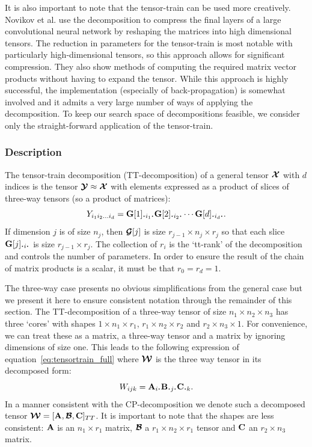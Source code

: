 {It is also important to note that the tensor-train can be used more creatively. 
Novikov et al. \autocite{Novikov} use the decomposition to compress the final layers of a 
large convolutional neural
network by reshaping the matrices into high dimensional tensors. The reduction in parameters for
the tensor-train is most notable with particularly high-dimensional tensors, so this approach allows
for significant compression. They also show methods of computing the required matrix vector products
without having to expand the tensor. While this approach is highly successful, the implementation
(especially of back-propagation) is somewhat involved and it admits a very large number of ways of
applying the decomposition. To keep our search space of decompositions feasible, we consider only
the straight-forward application of the tensor-train.

\subsubsection{Description}
The tensor-train decomposition (TT-decomposition) of a general tensor \(\bm{\mathcal{X}}\) with
\(d\) indices is the tensor \(\bm{\mathcal{Y}} \approx\bm{\mathcal{X}}\) with elements expressed as a
product of slices of three-way tensors (so a product of matrices):
\begin{equation}
			\label{eq:tensortrain_full}
	{Y}_{i_1i_2\dots i_d} 
		= \mat{G}[1]_{\midbullet i_1 \midbullet}\mat{G}[2]_{\midbullet i_2 \midbullet}
			\cdots \mat{G}[d]_{\midbullet i_d \midbullet}.
\end{equation}
If dimension \(j\) is of size \(n_j\), then \(\bm{\mathcal{G}}[j]\) is size 
\(r_{j-1} \times n_j \times r_{j}\) so that each slice \(\mat{G}[j]_{\midbullet i \midbullet}\)
is size \(r_{j-1} \times r_{j}\). The collection of \(r_i\) is the `tt-rank' of the
decomposition and controls the number of parameters. In order to ensure the result of the chain
of matrix products is a scalar, it must be that \(r_0 = r_d = 1\). \autocite{Osedelets2011}

The three-way case presents no obvious simplifications from the general case but we present it
here to ensure consistent notation through the remainder of this section. The TT-decomposition
of a three-way tensor of size \(n_1 \times n_2 \times n_3\) has three `cores' with shapes
\(1 \times n_1 \times r_1\), \(r_1 \times n_2 \times r_2\) and \(r_2 \times n_3 \times 1\). For
convenience, we can treat these as a matrix, a three-way tensor and a matrix by ignoring 
dimensions of size one. This leads to the following expression of 
equation~\ref{eq:tensortrain_full} where \(\bm{\mathcal{W}}\) is the three way tensor in its
decomposed form:
\begin{equation} \label{eq:tensortrain_three}
	W_{ijk} = \mat{A}_{i\midbullet} \mat{B}_{\midbullet j \midbullet} \mat{C}_{\midbullet k}.
\end{equation} In a manner consistent with the CP-decomposition we denote such a decomposed
tensor \(\bm{\mathcal{W}} = [\mathbf{A},\bm{\mathcal{B}},\mathbf{C}]_{TT}\). It is important to note that the
shapes are less consistent: \(\mathbf{A}\) is an \(n_1 \times r_1\) matrix, \(\bm{\mathcal{B}}\) a
\(r_1 \times n_2 \times r_1\) tensor and \(\mathbf{C}\) an \(r_2 \times n_3\) matrix.

}
